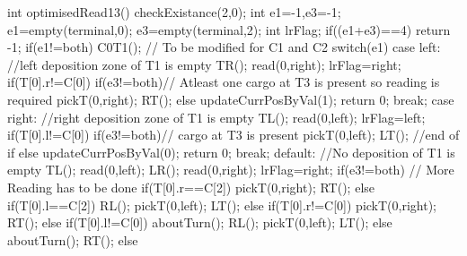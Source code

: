 int optimisedRead13()
{
	checkExistance(2,0);
    int e1=-1,e3=-1;
    e1=empty(terminal,0);
    e3=empty(terminal,2);
    int lrFlag;
    if((e1+e3)==4)
    {
        return -1;
    }
    if(e1!=both)
    {
        C0T1(); // To be modified for C1 and C2
        switch(e1)
        {
            case left:
                //left deposition zone of T1 is empty
                TR();
                read(0,right);
				lrFlag=right;
                if(T[0].r!=C[0])
                {
                    if(e3!=both)// Atleast one cargo at T3 is present so reading is required
                    {
                        pickT(0,right);
                        RT();
                    }
                    else
                    {
                        updateCurrPosByVal(1);
                        return 0;
                    }
                }
                break;
            case right:
                //right deposition zone of T1 is empty
                TL();
                read(0,left);
				lrFlag=left;
                if(T[0].l!=C[0])
                {
                    if(e3!=both)// cargo at T3 is present
                    {
                        pickT(0,left);
                        LT();
                    }//end of if
                    else
                    {
                        updateCurrPosByVal(0);
                        return 0;
                    }
                }
                break;
            default:
                //No deposition of T1 is empty
                TL();
                read(0,left);
                LR();
                read(0,right);
				lrFlag=right;
                if(e3!=both) // More Reading has to be done
                {
                    if(T[0].r==C[2])
                    {
                        pickT(0,right);
                        RT();
                    }
                    else if(T[0].l==C[2])
                    {
                        RL();
                        pickT(0,left);
                        LT();
                    }
                    else if(T[0].r!=C[0])
                    {
                        pickT(0,right);
                        RT();
                    }
                    else if(T[0].l!=C[0])
                    {
                        aboutTurn();
                        RL();
                        pickT(0,left);
                        LT();
                    }
                    else
                    {
                        aboutTurn();
                        RT();
                    }
                }
                else
}}}
